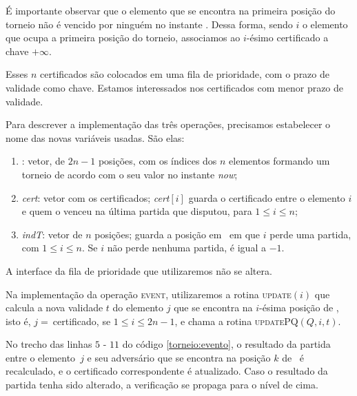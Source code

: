 É importante observar que o elemento que se encontra na primeira
posição do torneio não é vencido por ninguém no instante \now. Dessa
forma, sendo $i$ o elemento que ocupa a primeira posição do torneio,
associamos ao $i$-ésimo certificado a chave $+\infty$.



Esses $n$ certificados são colocados em uma fila de prioridade, com
o prazo de validade como chave. Estamos interessados nos
certificados com menor prazo de validade.

Para descrever a implementação das três operações, precisamos
estabelecer o nome das novas variáveis usadas. São elas:
\begin{enumerate}
    \item \torneio: vetor, de $2n - 1$ posições, com os índices dos
    $n$ elementos formando um torneio de acordo com o seu valor no
    instante \textit{now};

    \item \textit{cert}: vetor com os certificados;
    \textit{cert}$[i]$ guarda o certificado entre o elemento $i$ e
    quem o venceu na última partida que disputou, para $1 \leq i
    \leq n$;

    \item \textit{indT}: vetor de $n$ posições; \indt[$i$] guarda a
    posição em \torneio~em que $i$ perde uma partida, com $1 \leq i
    \leq n$. Se $i$ não perde nenhuma partida, \indt[$i$] é igual a
    $-1$.
\end{enumerate}

A interface da fila de prioridade que utilizaremos não se altera.

Na implementação da operação \textsc{event}, utilizaremos a rotina
\textsc{update}$(i)$ que calcula a nova validade $t$ do elemento $j$
que se encontra na $i$-ésima posição de \torneio, isto é, $j
=~$\torneio[$i$] certificado, se $1 \leq i \leq 2n - 1$, e chama a
rotina \textsc{updatePQ}$(Q, i, t)$.





No trecho das linhas $5$ - $11$ do código \ref{torneio:evento}, o
resultado da partida entre o elemento~$j$ e seu adversário que se
encontra na posição $k$ de \torneio~é recalculado, e o certificado
correspondente é atualizado. Caso o resultado da partida tenha sido
alterado, a verificação se propaga para o nível de cima.

